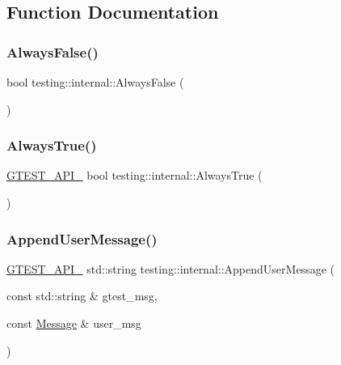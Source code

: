 \subsection{Function Documentation}
\mbox{\label{namespacetesting_1_1internal_a4b24c851ab13569b1b15b3d259b60d2e}} 
\subsubsection{\texorpdfstring{Always\+False()}{AlwaysFalse()}}
{\footnotesize\ttfamily bool testing\+::internal\+::\+Always\+False (\begin{DoxyParamCaption}{ }\end{DoxyParamCaption})\hspace{0.3cm}{\ttfamily [inline]}}

\mbox{\label{namespacetesting_1_1internal_a4d46f09c3bfe68700b7f728d2cc3782f}} 
\subsubsection{\texorpdfstring{Always\+True()}{AlwaysTrue()}}
{\footnotesize\ttfamily \hyperlink{gtest-port_8h_aa73be6f0ba4a7456180a94904ce17790}{G\+T\+E\+S\+T\+\_\+\+A\+P\+I\+\_\+} bool testing\+::internal\+::\+Always\+True (\begin{DoxyParamCaption}{ }\end{DoxyParamCaption})}

\mbox{\label{namespacetesting_1_1internal_af69e146a989e8d48def39a0cc59461c9}} 
\subsubsection{\texorpdfstring{Append\+User\+Message()}{AppendUserMessage()}}
{\footnotesize\ttfamily \hyperlink{gtest-port_8h_aa73be6f0ba4a7456180a94904ce17790}{G\+T\+E\+S\+T\+\_\+\+A\+P\+I\+\_\+} std\+::string testing\+::internal\+::\+Append\+User\+Message (\begin{DoxyParamCaption}\item[{const std\+::string \&}]{gtest\+\_\+msg,  }\item[{const \hyperlink{classtesting_1_1Message}{Message} \&}]{user\+\_\+msg }\end{DoxyParamCaption})}

